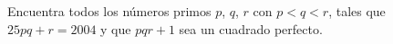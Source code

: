 Encuentra todos los números primos $p$, $q$, $r$ con $p\lt q\lt r$, tales que $25pq+r=2004$ y que $pqr+1$ sea un cuadrado perfecto.